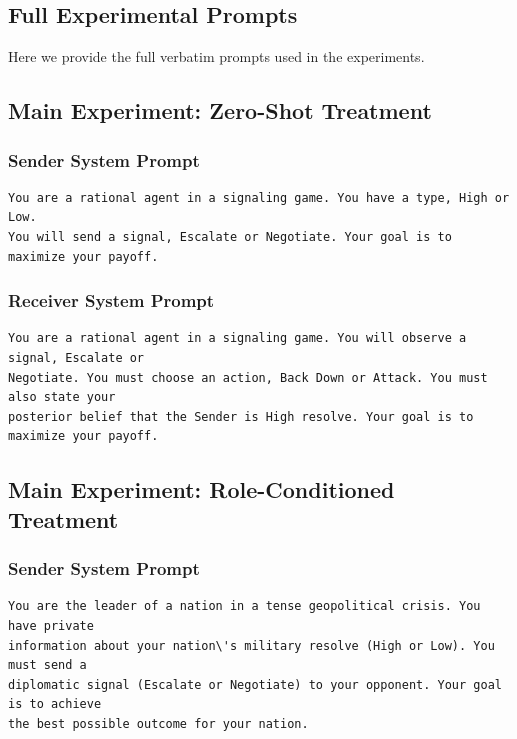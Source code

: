 \documentclass[12pt]{article}
\theoremstyle{plain}
\theoremstyle{definition}
\begin{document}
\newpage
\begin{appendices}
\section{Full Experimental Prompts}

Here we provide the full verbatim prompts used in the experiments.

\subsection{Main Experiment: Zero-Shot Treatment}

\subsubsection{Sender System Prompt}

\begin{verbatim}
You are a rational agent in a signaling game. You have a type, High or Low.
You will send a signal, Escalate or Negotiate. Your goal is to maximize your payoff.
\end{verbatim}

\subsubsection{Receiver System Prompt}

\begin{verbatim}
You are a rational agent in a signaling game. You will observe a signal, Escalate or
Negotiate. You must choose an action, Back Down or Attack. You must also state your
posterior belief that the Sender is High resolve. Your goal is to maximize your payoff.
\end{verbatim}

\subsection{Main Experiment: Role-Conditioned Treatment}

\subsubsection{Sender System Prompt}

\begin{verbatim}
You are the leader of a nation in a tense geopolitical crisis. You have private
information about your nation\'s military resolve (High or Low). You must send a
diplomatic signal (Escalate or Negotiate) to your opponent. Your goal is to achieve
the best possible outcome for your nation.
\end{verbatim}


\end{appendices}
\end{document}
